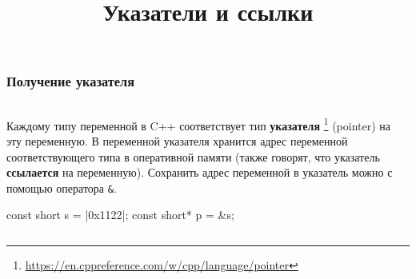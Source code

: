 \documentclass[compress, 8pt]{beamer}
\title{Указатели и ссылки}
\begin{document}
\frame[plain]{\titlepage}

\begin{frame}[fragile]

    \frametitle{Получение указателя}

    \begin{columns}[T]

        \begin{column}{0.5\textwidth}

            Каждому типу переменной в C++ соответствует тип \textbf{указателя}
            \footnote{\url{https://en.cppreference.com/w/cpp/language/pointer}}
            (pointer) на эту переменную.
            В переменной указателя хранится адрес переменной соответствующего
            типа в оперативной памяти (также говорят, что указатель
            \textbf{ссылается} на переменную).
            Сохранить адрес переменной в указатель можно с помощью оператора \verb|&|.

            \begin{myinplacelisting}[minted language=cpp]
const short s = |\colorbox{green!20}{0x1122}|;
const short* p = &s;
            \end{myinplacelisting}

        \end{column}

        \begin{column}{0.5\textwidth}

            \centering

            \begin{tikzpicture} [
                bytenode/.style={
                    rectangle,
                    thick,
                    minimum width=9mm,
                    minimum height=4mm
                }
            ]


\end{tikzpicture}
\end{column}
\end{columns}
\end{frame}
\end{document}
